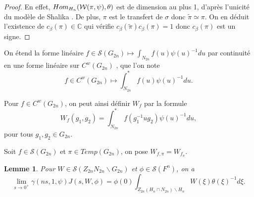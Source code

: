 \documentclass{amsart}
\newtheorem{lemme}{Lemme}[section]
\DeclareMathOperator{\Hom}{\mathnormal{Hom}}
\begin{document}
\begin{proof}
En effet, $\Hom_{H_n}(\mathcal{W}(\pi, \psi), \theta)$ est de dimension au plus 1, d'après l'unicité du modèle de Shalika \cite{jacquet-rallis}. De plus, $\pi$ est le transfert de $\sigma$ donc $\widetilde{\pi} \simeq \pi$. On en déduit l'existence de $c_\beta(\pi) \in \mathbb{C}$ qui vérifie $c_\beta(\widetilde{\pi})c_\beta(\pi) = 1$ donc $c_\beta(\pi)$ est un signe.
\end{proof}

On étend la forme linéaire $f \in \mathcal{S}(G_{2n}) \mapsto \int_{N_{2n}} f(u)\psi(u)^{-1} du$ par continuité en une forme linéaire sur $C^w(G_{2n})$ \cite{beuzart-plessis}, que l'on note
\begin{equation}
f \in C^w(G_{2n}) \mapsto \int_{N_{2n}}^* f(u)\psi(u)^{-1} du.
\end{equation}

Pour $f \in C^w(G_{2n})$, on peut ainsi définir $W_f$ par la formule
\begin{equation}
W_f(g_1, g_2) = \int_{N_{2n}}^* f(g_1^{-1}ug_2)\psi(u)^{-1} du,
\end{equation}
pour tous $g_1, g_2 \in G_{2n}$.

Soit $f \in \mathcal{S}(G_{2n})$ et $\pi \in Temp(G_{2n})$, on pose $W_{f, \pi} = W_{f_\pi}$.

\begin{lemme}
\label{limitezeta}
Pour $W \in \mathcal{S}(Z_{2n} N_{2n} \backslash G_{2n})$ et $\phi \in \mathcal{S}(F^n)$, on a
\begin{equation}
\lim_{s\rightarrow 0^+} \gamma(ns, 1, \psi) J(s, W, \phi) = \phi(0) \int_{Z_{2n}(H_n \cap N_{2n}) \backslash H_n} W(\xi) \theta(\xi)^{-1} d\xi.
\end{equation}
\end{lemme}
\end{document}
